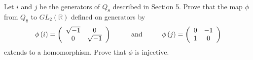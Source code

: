 \documentclass[12pt]{article}
\newenvironment{problem}[2][Exercise]{\begin{trivlist}
\item[\hskip \labelsep {\bfseries #1}\hskip \labelsep {\bfseries #2.}]}{\end{trivlist}}
\begin{document}
\begin{problem}{1.6.26}
Let $i$ and $j$ be the generators of $Q_8$ described in Section 5. Prove that the map $\phi$ from $Q_8$ to $GL_2\left(\mathbb{R}\right)$ defined on generators by
$$ \phi\left(i\right) = \left( \begin{array}{cc} \sqrt{-1} & 0 \\ 0 & \sqrt{-1} \end{array}\right) \hspace{10mm} \text{and} \hspace{10mm} \phi\left(j\right) = \left( \begin{array}{cc}0 & -1 \\ 1 & 0 \end{array}\right) $$ extends to a homomorphism. Prove that $\phi$ is injective.
\end{problem}
\end{document}
